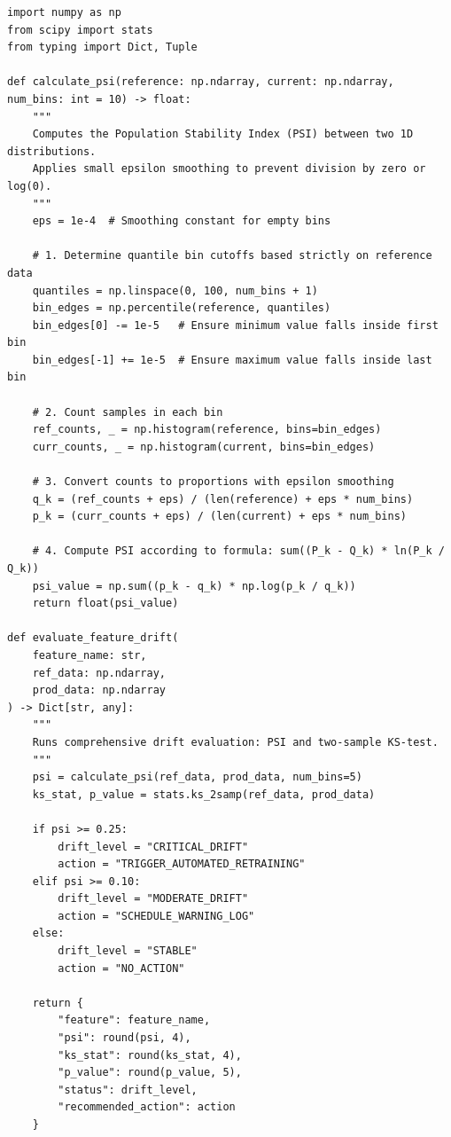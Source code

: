\begin{lstlisting}[style=pythonstyle, caption={Production drift detection script with PSI and Kolmogorov-Smirnov test.}, label={lst:drift_detector}]
import numpy as np
from scipy import stats
from typing import Dict, Tuple

def calculate_psi(reference: np.ndarray, current: np.ndarray, num_bins: int = 10) -> float:
    """
    Computes the Population Stability Index (PSI) between two 1D distributions.
    Applies small epsilon smoothing to prevent division by zero or log(0).
    """
    eps = 1e-4  # Smoothing constant for empty bins
    
    # 1. Determine quantile bin cutoffs based strictly on reference data
    quantiles = np.linspace(0, 100, num_bins + 1)
    bin_edges = np.percentile(reference, quantiles)
    bin_edges[0] -= 1e-5   # Ensure minimum value falls inside first bin
    bin_edges[-1] += 1e-5  # Ensure maximum value falls inside last bin

    # 2. Count samples in each bin
    ref_counts, _ = np.histogram(reference, bins=bin_edges)
    curr_counts, _ = np.histogram(current, bins=bin_edges)

    # 3. Convert counts to proportions with epsilon smoothing
    q_k = (ref_counts + eps) / (len(reference) + eps * num_bins)
    p_k = (curr_counts + eps) / (len(current) + eps * num_bins)

    # 4. Compute PSI according to formula: sum((P_k - Q_k) * ln(P_k / Q_k))
    psi_value = np.sum((p_k - q_k) * np.log(p_k / q_k))
    return float(psi_value)

def evaluate_feature_drift(
    feature_name: str, 
    ref_data: np.ndarray, 
    prod_data: np.ndarray
) -> Dict[str, any]:
    """
    Runs comprehensive drift evaluation: PSI and two-sample KS-test.
    """
    psi = calculate_psi(ref_data, prod_data, num_bins=5)
    ks_stat, p_value = stats.ks_2samp(ref_data, prod_data)

    if psi >= 0.25:
        drift_level = "CRITICAL_DRIFT"
        action = "TRIGGER_AUTOMATED_RETRAINING"
    elif psi >= 0.10:
        drift_level = "MODERATE_DRIFT"
        action = "SCHEDULE_WARNING_LOG"
    else:
        drift_level = "STABLE"
        action = "NO_ACTION"

    return {
        "feature": feature_name,
        "psi": round(psi, 4),
        "ks_stat": round(ks_stat, 4),
        "p_value": round(p_value, 5),
        "status": drift_level,
        "recommended_action": action
    }


\end{lstlisting}
